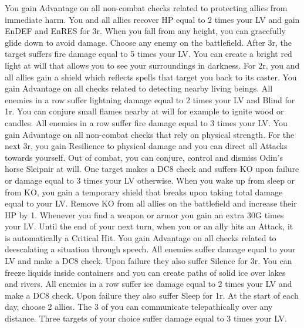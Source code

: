 %
{You gain Advantage on all non-combat checks related to protecting allies from immediate harm.}
{You and all allies recover HP equal to 2 times your LV and gain EnDEF and EnRES for 3r.}
%
\vfill
%
{When you fall from any height, you can gracefully glide down to avoid damage.}
{Choose any enemy on the battlefield. After 3r, the target suffers fire damage equal to 5 times your LV.}
%
\vfill
%
{You can create a bright red light at will that allows you to see your surroundings in darkness.}
{For 2r, you and all allies gain a shield which reflects spells that target you back to its caster.}
%
\vfill
%
{You gain Advantage on all checks related to detecting nearby living beings.}
{All enemies in a row suffer lightning damage equal to 2 times your LV and Blind for 1r.}
%
\vfill
%
{You can conjure small flames nearby at will for example to ignite wood or candles.}
{All enemies in a row suffer fire damage equal to 3 times your LV.}
%
\vfill
%
{You gain Advantage on all non-combat checks that rely on physical strength.}
{For the next 3r, you gain Resilience to physical damage and you can direct all Attacks towards yourself.}
%
\vfill
%
{Out of combat, you can conjure, control and dismiss Odin's horse Sleipnir at will.}
{One target makes a DC8 check and suffers KO upon failure or damage equal to 3 times your LV otherwise.}
%
\vfill
%
{When you wake up from sleep or from KO, you gain a temporary shield that breaks upon taking total damage equal to your LV.}
{Remove KO from all allies on the battlefield and increase their HP by 1.}
%
\vfill
%
{Whenever you find a weapon or armor you gain an extra 30G times your LV.}
{Until the end of your next turn, when you or an ally hits an Attack, it is automatically a Critical Hit.}
%
\vfill
%
{You gain Advantage on all checks related to deescalating a situation through speech.}
{All enemies suffer damage equal to your LV and make a DC8 check. Upon failure they also suffer Silence for 3r.}
%
\vfill
%
{You can freeze liquids inside containers and you can create paths of solid ice over lakes and rivers.}
{All enemies in a row suffer ice damage equal to 2 times your LV and make a DC8 check. Upon failure they also suffer Sleep for 1r.}
%
\vfill
%
{At the start of each day, choose 2 allies. The 3 of you can communicate telepathically over any distance.}
{Three targets of your choice suffer damage equal to 3 times your LV.}
%
\clearpage